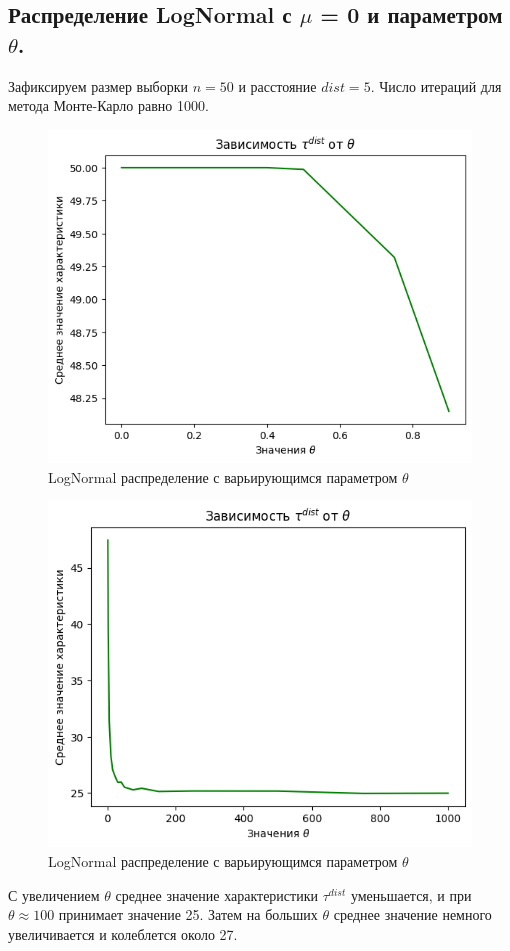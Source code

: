\documentclass{report}
\begin{document}
\subsection{Распределение LogNormal с $\mu$ = 0 и параметром $\theta$.}
Зафиксируем размер выборки $n = 50$ и расстояние $dist = 5$. Число итераций для метода Монте-Карло равно 1000.
\begin{figure}[h]
    \centering
    \includegraphics[width=0.5\linewidth]{5.png}
    \caption{LogNormal распределение с варьирующимся параметром $\theta$}
\end{figure}
\begin{figure}[h]
    \centering
    \includegraphics[width=0.5\linewidth]{6.png}
    \caption{LogNormal распределение с варьирующимся параметром $\theta$}
\end{figure}
\newline
\newline
С увеличением $\theta$ среднее значение характеристики $\tau^{dist}$ уменьшается, и при $\theta \approx 100$ принимает значение 25. Затем на больших $\theta$ среднее значение немного увеличивается и колеблется около 27.
\end{document}
